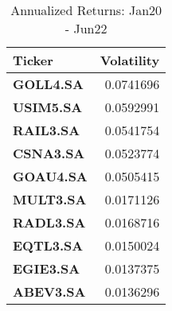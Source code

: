 \begin{table}
	\centering
	\fontsize{9}{9}
	\selectfont
	\begin{tabular}{lr}
		\toprule
		Ticker            & Volatility \\
		\midrule
		\textbf{GOLL4.SA} & 0.0741696  \\
		\textbf{USIM5.SA} & 0.0592991  \\
		\textbf{RAIL3.SA} & 0.0541754  \\
		\textbf{CSNA3.SA} & 0.0523774  \\
		\textbf{GOAU4.SA} & 0.0505415  \\
		\textbf{MULT3.SA} & 0.0171126  \\
		\textbf{RADL3.SA} & 0.0168716  \\
		\textbf{EQTL3.SA} & 0.0150024  \\
		\textbf{EGIE3.SA} & 0.0137375  \\
		\textbf{ABEV3.SA} & 0.0136296  \\
		\bottomrule
	\end{tabular} \caption{Annualized Returns: Jan20 - Jun22}
	\label{tab:StocksVol}  %
\end{table}
